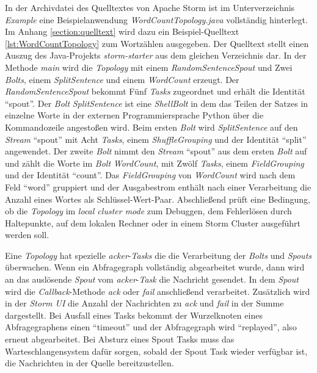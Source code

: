 In der Archivdatei des Quelltextes von Apache Storm  ist im Unterverzeichnis \textit{Example} eine Beispielanwendung \textit{\textit{WordCountTopology.java}} vollständig hinterlegt. Im Anhang \ref{section:quelltext} wird dazu ein Beispiel-Quelltext \ref{lst:WordCountTopology} zum Wortzählen ausgegeben. Der Quelltext stellt einen Auszug des Java-Projekts \textit{storm-starter} aus dem gleichen Verzeichnis dar. In der Methode \textit{main} wird die \textit{Topology} mit einem \textit{RandomSentenceSpout} und Zwei \textit{Bolts}, einem \textit{SplitSentence} und einem \textit{WordCount} erzeugt. Der \textit{RandomSentenceSpout} bekommt Fünf \textit{Tasks} zugeordnet und erhält die Identität "`spout"'. Der \textit{Bolt} \textit{SplitSentence} ist eine \textit{ShellBolt} in dem das Teilen der Satzes in einzelne Worte in der externen Programmiersprache Python über die Kommandozeile angestoßen wird. Beim ersten \textit{Bolt} wird \textit{SplitSentence} auf den \textit{Stream} "`spout"' mit Acht \textit{Tasks}, einem \textit{ShuffleGrouping} und der Identität "`split"' angewendet. Der zweite \textit{Bolt} nimmt den \textit{Stream} "`spout"' aus dem ersten \textit{Bolt} auf und zählt die Worte im \textit{Bolt} \textit{WordCount}, mit Zwölf \textit{Tasks}, einem \textit{FieldGrouping} und der Identität "`count"'. Das \textit{FieldGrouping} von \textit{WordCount} wird nach dem Feld "`word"' gruppiert und der Ausgabestrom enthält nach einer Verarbeitung die Anzahl eines Wortes als Schlüssel-Wert-Paar. Abschließend prüft eine Bedingung, ob die \textit{Topology} im \textit{local cluster mode} zum Debuggen, dem Fehlerlösen durch Haltepunkte, auf dem lokalen Rechner oder in einem Storm Cluster ausgeführt werden soll.

Eine \textit{Topology} hat spezielle \textit{acker}-\textit{Tasks} die die Verarbeitung der \textit{Bolts} und \textit{Spouts} überwachen. Wenn ein Abfragegraph vollständig abgearbeitet wurde, dann wird an das auslösende \textit{Spout} vom \textit{acker}-\textit{Task} die Nachricht gesendet. In dem \textit{Spout} wird die \textit{Callback}-Methode \textit{ack} oder \textit{fail} anschließend verarbeitet. Zusätzlich wird in der \textit{Storm UI} die Anzahl der Nachrichten zu \textit{ack} und \textit{fail} in der Summe dargestellt. Bei Ausfall eines Tasks bekommt der Wurzelknoten eines Abfragegraphens einen "`timeout"' und der Abfragegraph wird "`replayed"', also erneut abgearbeitet. Bei Absturz eines Spout Tasks muss das Warteschlangensystem dafür sorgen, sobald der Spout Task wieder verfügbar ist, die Nachrichten in der Quelle bereitzustellen. 

